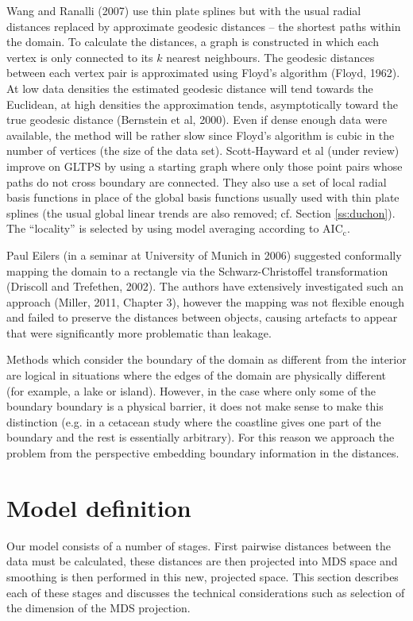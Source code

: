 \documentclass[useAMS, referee]{biom}
\begin{document}
Wang and Ranalli (2007) use thin plate splines but with the usual radial distances replaced by approximate geodesic distances -- the shortest paths within the domain. To calculate the distances, a graph is constructed in which each vertex is only connected to its $k$ nearest neighbours. The geodesic distances between each vertex pair is approximated using  Floyd's algorithm (Floyd, 1962). At low data densities the estimated geodesic distance will tend towards the Euclidean, at high densities the approximation tends, asymptotically toward the true geodesic distance (Bernstein et al, 2000). Even if  dense enough data were available, the method will be rather slow since Floyd's algorithm is cubic in the number of vertices (the size of the data set). Scott-Hayward et al (under review) improve on GLTPS by using a starting graph where only those point pairs whose paths do not cross boundary are connected. They also use a set of local radial basis functions in place of the global basis functions usually used with thin plate splines (the usual global linear trends are also removed; cf. Section \ref{ss:duchon}). The ``locality'' is selected by using model averaging according to AIC$_\text{c}$.

Paul Eilers (in a seminar at University of Munich in 2006) suggested conformally mapping the domain to a rectangle via the Schwarz-Christoffel transformation (Driscoll and Trefethen, 2002). The authors have extensively investigated such an approach (Miller, 2011, Chapter 3), however the mapping was not flexible enough and failed to preserve the distances between objects, causing artefacts to appear that were significantly more problematic than leakage. 

Methods which consider the boundary of the domain as different from the interior are logical in situations where the edges of the domain are physically different (for example, a lake or island). However, in the case where only some of the boundary boundary is a physical barrier, it does not make sense to make this distinction (e.g. in a cetacean study where the coastline gives one part of the boundary and the rest is essentially arbitrary). For this reason we approach the problem from the perspective embedding boundary information in the distances.

\section{Model definition}
\label{proposed-model}

Our model consists of a number of stages. First pairwise distances between the data must be calculated, these distances are then projected into MDS space and smoothing is then performed in this new, projected space. This section describes each of these stages and discusses the technical considerations such as selection of the dimension of the MDS projection.
\end{document}

